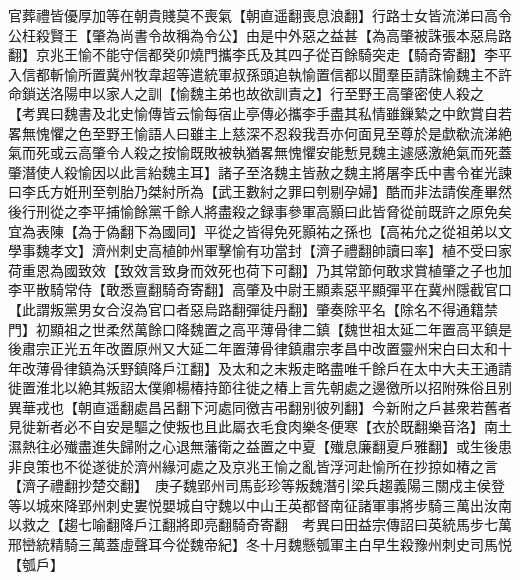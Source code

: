 官葬禮皆優厚加等在朝貴賤莫不喪氣【朝直遥翻喪息浪翻】行路士女皆流涕曰高令公枉殺賢王【肇為尚書令故稱為令公】由是中外惡之益甚【為高肇被誅張本惡烏路翻】京兆王愉不能守信都癸卯燒門攜李氏及其四子從百餘騎突走【騎奇寄翻】李平入信都斬愉所置冀州牧韋超等遣統軍叔孫頭追執愉置信都以聞羣臣請誅愉魏主不許命鎖送洛陽申以家人之訓【愉魏主弟也故欲訓責之】行至野王高肇密使人殺之　【考異曰魏書及北史愉傳皆云愉每宿止亭傳必攜李手盡其私情雖鏁縶之中飲賞自若畧無愧懼之色至野王愉語人曰雖主上慈深不忍殺我吾亦何面見至尊於是歔欷流涕絶氣而死或云高肇令人殺之按愉既敗被執猶畧無愧懼安能慙見魏主遽感激絶氣而死蓋肇潛使人殺愉因以此言紿魏主耳】諸子至洛魏主皆赦之魏主將屠李氏中書令崔光諫曰李氏方姙刑至刳胎乃桀紂所為【武王數紂之罪曰刳剔孕婦】酷而非法請俟產畢然後行刑從之李平捕愉餘黨千餘人將盡殺之録事參軍高顥曰此皆脅從前既許之原免矣宜為表陳【為于偽翻下為國同】平從之皆得免死顥祐之孫也【高祐允之從祖弟以文學事魏孝文】濟州刺史高植帥州軍擊愉有功當封【濟子禮翻帥讀曰率】植不受曰家荷重恩為國致效【致效言致身而效死也荷下可翻】乃其常節何敢求賞植肇之子也加李平散騎常侍【敢悉亶翻騎奇寄翻】高肇及中尉王顯素惡平顯彈平在冀州隱截官口【此謂叛黨男女合沒為官口者惡烏路翻彈徒丹翻】肇奏除平名【除名不得通籍禁門】初顯祖之世柔然萬餘口降魏置之高平薄骨律二鎮【魏世祖太延二年置高平鎮是後肅宗正光五年改置原州又大延二年置薄骨律鎮肅宗孝昌中改置靈州宋白曰太和十年改薄骨律鎮為沃野鎮降戶江翻】及太和之末叛走略盡唯千餘戶在太中大夫王通請徙置淮北以絶其叛詔太僕卿楊椿持節往徙之椿上言先朝處之邊徼所以招附殊俗且别異華戎也【朝直遥翻處昌呂翻下河處同徼吉弔翻别彼列翻】今新附之戶甚衆若舊者見徙新者必不自安是驅之使叛也且此屬衣毛食肉樂冬便寒【衣於既翻樂音洛】南土濕熱往必殱盡進失歸附之心退無藩衛之益置之中夏【殱息廉翻夏戶雅翻】或生後患非良策也不從遂徙於濟州緣河處之及京兆王愉之亂皆浮河赴愉所在抄掠如椿之言【濟子禮翻抄楚交翻】　庚子魏郢州司馬彭珍等叛魏潛引梁兵趨義陽三關戍主侯登等以城來降郢州刺史婁悦嬰城自守魏以中山王英都督南征諸軍事將步騎三萬出汝南以救之【趨七喻翻降戶江翻將即亮翻騎奇寄翻　考異曰田益宗傳詔曰英統馬步七萬邢巒統精騎三萬蓋虛聲耳今從魏帝紀】冬十月魏懸瓠軍主白早生殺豫州刺史司馬悦【瓠戶】

